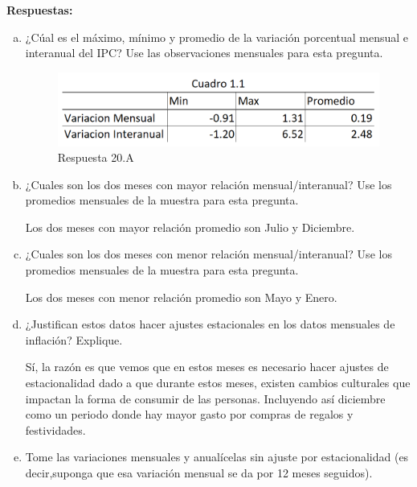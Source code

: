 \textbf{Respuestas:}
\begin{enumerate}[(a)]
    \item ¿Cúal es el máximo, mínimo y promedio de la variación porcentual mensual e interanual del IPC? Use las observaciones mensuales para esta pregunta.
    
    \begin{figure}[h]
        \centering
        \includegraphics[scale=0.3]{Images/cuadro20.a.png}
        \caption{Respuesta 20.A}
        \label{fig:cuadro 20}
    \end{figure}
    
    \item  ¿Cuales son los dos meses con mayor relación mensual/interanual? Use los promedios mensuales de la muestra para esta pregunta.
    
    Los dos meses con mayor relación promedio son Julio y Diciembre.
    \item  ¿Cuales son los dos meses con menor relación mensual/interanual? Use los promedios mensuales de la muestra para esta pregunta.
    
    Los dos meses con menor relación promedio son Mayo y Enero.
    
    \item ¿Justifican estos datos hacer ajustes estacionales en los datos mensuales de inflación? Explique.
    
    Sí, la razón es que vemos que en estos meses es necesario hacer ajustes de estacionalidad dado a que durante estos meses, existen cambios culturales que impactan la forma de consumir de las personas. Incluyendo así diciembre como un periodo donde hay mayor gasto por compras de regalos y festividades.
    
    \item Tome las variaciones mensuales y anualícelas sin ajuste por estacionalidad (es decir,suponga que esa variación mensual se da por 12 meses seguidos). 
    

\end{enumerate}
